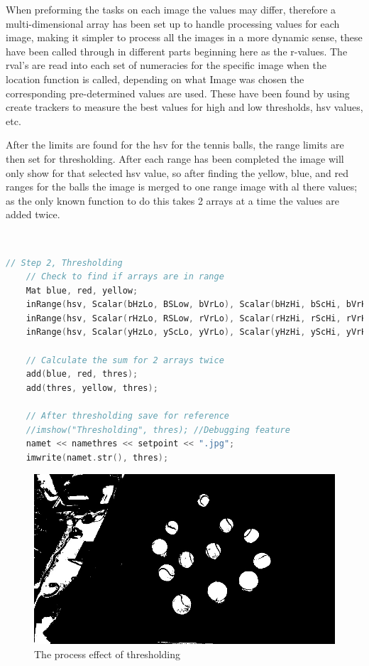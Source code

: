 \documentclass[a4paper, 10pt]{article}
\begin{document}
When preforming the tasks on each image the values may differ, therefore a multi-dimensional array has been set up to handle processing values for each image, making it simpler to process all the images in a more dynamic sense, these have been called through in different parts beginning here as the r-values. The rval's are read into each set of numeracies for the specific image when the location function is called, depending on what Image was chosen the corresponding pre-determined values are used. These have been found by using create trackers to measure the best values for high and low thresholds, hsv values, etc.

After the limits are found for the hsv for the tennis balls, the range limits are then set for thresholding. After each range has been completed the image will only show for that selected hsv value, so after finding the yellow, blue, and red ranges for the balls the image is merged to one range image with al there values; as the only known function to do this takes 2 arrays at a time the values are added twice.

\

\begin{lstlisting}[language = C++]
	// Step 2, Thresholding 
	// Check to find if arrays are in range
	Mat blue, red, yellow;
	inRange(hsv, Scalar(bHzLo, BSLow, bVrLo), Scalar(bHzHi, bScHi, bVrHi), blue);
	inRange(hsv, Scalar(rHzLo, RSLow, rVrLo), Scalar(rHzHi, rScHi, rVrHi), red);
	inRange(hsv, Scalar(yHzLo, yScLo, yVrLo), Scalar(yHzHi, yScHi, yVrHi), yellow);
	
	// Calculate the sum for 2 arrays twice 
	add(blue, red, thres);
	add(thres, yellow, thres);

	// After thresholding save for reference
	//imshow("Thresholding", thres); //Debugging feature
	namet << namethres << setpoint << ".jpg";
	imwrite(namet.str(), thres);
\end{lstlisting}

\begin{figure}[H]
  \includegraphics[width=\linewidth]{images/Thresholding}
  \caption{The process effect of thresholding}
  \label{fig:The process effect of thresholding}
\end{figure}
\end{document}
